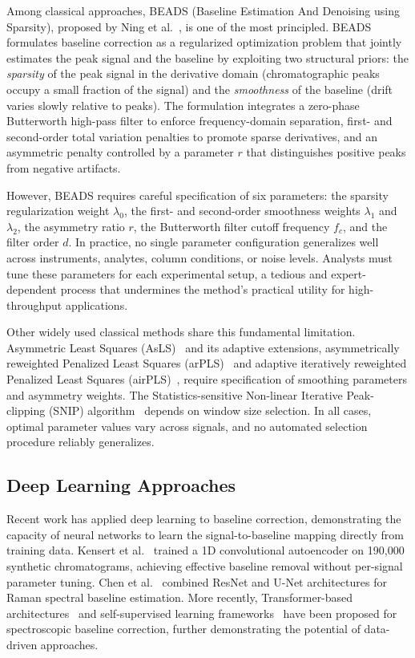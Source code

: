 Among classical approaches, BEADS (Baseline Estimation And Denoising using Sparsity), proposed by Ning et al.~\cite{ning2014beads}, is one of the most principled. BEADS formulates baseline correction as a regularized optimization problem that jointly estimates the peak signal and the baseline by exploiting two structural priors: the \emph{sparsity} of the peak signal in the derivative domain (chromatographic peaks occupy a small fraction of the signal) and the \emph{smoothness} of the baseline (drift varies slowly relative to peaks). The formulation integrates a zero-phase Butterworth high-pass filter to enforce frequency-domain separation, first- and second-order total variation penalties to promote sparse derivatives, and an asymmetric penalty controlled by a parameter $r$ that distinguishes positive peaks from negative artifacts.

However, BEADS requires careful specification of six parameters: the sparsity regularization weight $\lambda_0$, the first- and second-order smoothness weights $\lambda_1$ and $\lambda_2$, the asymmetry ratio $r$, the Butterworth filter cutoff frequency $f_c$, and the filter order $d$. In practice, no single parameter configuration generalizes well across instruments, analytes, column conditions, or noise levels. Analysts must tune these parameters for each experimental setup, a tedious and expert-dependent process that undermines the method's practical utility for high-throughput applications.

Other widely used classical methods share this fundamental limitation. Asymmetric Least Squares (AsLS)~\cite{eilers2005baseline} and its adaptive extensions, asymmetrically reweighted Penalized Least Squares (arPLS)~\cite{baek2015arpls} and adaptive iteratively reweighted Penalized Least Squares (airPLS)~\cite{zhang2010airpls}, require specification of smoothing parameters and asymmetry weights. The Statistics-sensitive Non-linear Iterative Peak-clipping (SNIP) algorithm~\cite{morhac2008snip} depends on window size selection. In all cases, optimal parameter values vary across signals, and no automated selection procedure reliably generalizes.

\subsection{Deep Learning Approaches}
\label{sec:intro_dl}

Recent work has applied deep learning to baseline correction, demonstrating the capacity of neural networks to learn the signal-to-baseline mapping directly from training data. Kensert et al.~\cite{kensert2021deep} trained a 1D convolutional autoencoder on 190,000 synthetic chromatograms, achieving effective baseline removal without per-signal parameter tuning. Chen et al.~\cite{chen2022resnet} combined ResNet and U-Net architectures for Raman spectral baseline estimation. More recently, Transformer-based architectures~\cite{zhao20251dtrans} and self-supervised learning frameworks~\cite{hu2024rspssl} have been proposed for spectroscopic baseline correction, further demonstrating the potential of data-driven approaches.

